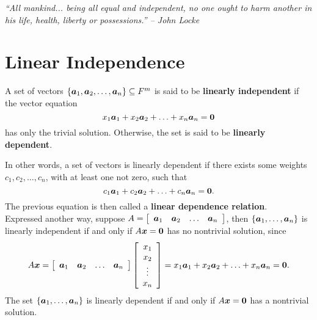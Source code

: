 \begin{center} 
\emph{``All mankind... being all equal and independent, no one ought to harm another in his life, health, liberty or possessions.'' -- John Locke}
\end{center}

\section{Linear Independence}\label{sec:independence}
\begin{Def} A set of vectors $\{\bb a_1, \bb a_2, \ldots, \bb a_n\}\subseteq F^m$ is said to be \textbf{linearly independent} if the vector equation 
\[x_1\bb a_1 + x_2\bb a_2 + \ldots + x_n\bb a_n =  \bb 0\] has only the trivial solution. Otherwise, the set is said to be \textbf{linearly dependent}. 
\end{Def}

In other words, a set of vectors is linearly dependent if there exists some weights $c_1, c_2, \ldots, c_n$, with at least one not zero, such that 
\[c_1\bb a_1 + c_2\bb a_2 + \ldots + c_n\bb a_n = \bb 0.\] The previous equation is then called a \textbf{linear dependence relation}.\\

Expressed another way, suppose $A = \mtx{rrrr}{ \bb a_1 & \bb a_2 & \ldots & \bb a_n}$, then $\{\bb a_1, \ldots, \bb a_n\}$ is linearly independent if and only if $A\bb x = \bb 0$ has no nontrivial solution, since 
\[A\bb x = \mtx{rrrr}{ \bb a_1 & \bb a_2 & \ldots & \bb a_n}\mtx{c}{x_1 \\ x_2 \\ \vdots \\ x_n} = x_1\bb a_1 + x_2\bb a_2 + \ldots + x_n\bb a_n =  \bb 0.\] The set $\{\bb a_1, \ldots, \bb a_n\}$ is linearly dependent if and only if $A\bb x = \bb 0$ has a nontrivial solution.\\

